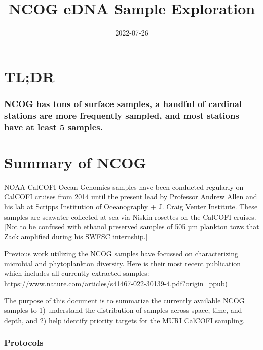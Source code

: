 \documentclass[
]{article}
\title{NCOG eDNA Sample Exploration}
\author{}
\date{\vspace{-2.5em}2022-07-26}
\begin{document}
\maketitle

\hypertarget{tldr}{%
\section{TL;DR}\label{tldr}}

\hypertarget{ncog-has-tons-of-surface-samples-a-handful-of-cardinal-stations-are-more-frequently-sampled-and-most-stations-have-at-least-5-samples.}{%
\subsubsection{NCOG has tons of surface samples, a handful of cardinal
stations are more frequently sampled, and most stations have at least 5
samples.}\label{ncog-has-tons-of-surface-samples-a-handful-of-cardinal-stations-are-more-frequently-sampled-and-most-stations-have-at-least-5-samples.}}

\hypertarget{summary-of-ncog}{%
\section{Summary of NCOG}\label{summary-of-ncog}}

NOAA-CalCOFI Ocean Genomics samples have been conducted regularly on
CalCOFI cruises from 2014 until the present lead by Professor Andrew
Allen and his lab at Scripps Institution of Oceanography + J. Craig
Venter Institute. These samples are seawater collected at sea via Niskin
rosettes on the CalCOFI cruises. {[}Not to be confused with ethanol
preserved samples of 505 µm plankton tows that Zack amplified during his
SWFSC internship.{]}

Previous work utilizing the NCOG samples have focussed on characterizing
microbial and phytoplankton diversity. Here is their most recent
publication which includes all currently extracted samples:
\url{https://www.nature.com/articles/s41467-022-30139-4.pdf?origin=ppub)=}

The purpose of this document is to summarize the currently available
NCOG samples to 1) understand the distribution of samples across space,
time, and depth, and 2) help identify priority targets for the MURI
CalCOFI sampling.

\hypertarget{protocols}{%
\subsubsection{Protocols}\label{protocols}}
\end{document}
